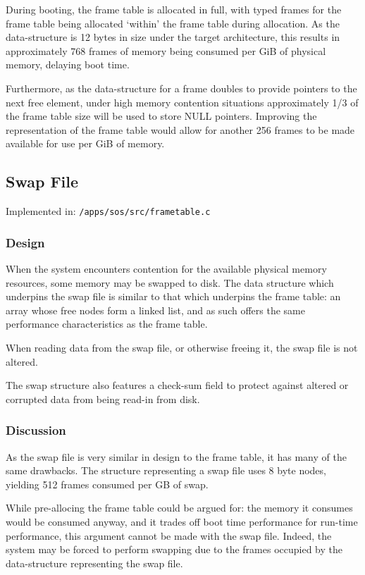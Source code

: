 \documentclass[a4paper,12pt]{article}
\begin{document}
During booting, the frame table is allocated in full, with typed frames for
the frame table being allocated `within' the frame table during allocation.
As the data-structure is 12 bytes in size under the target architecture, this
results in approximately 768 frames of memory being consumed per GiB of
physical memory, delaying boot time.

Furthermore, as the data-structure for a frame doubles to provide pointers to
the next free element, under high memory contention situations approximately
1/3 of the frame table size will be used to store NULL pointers.  Improving
the representation of the frame table would allow for another 256 frames to be
made available for use per GiB of memory.

\subsection{Swap File}
Implemented in: \texttt{/apps/sos/src/frametable.c}

\subsubsection{Design}
When the system encounters contention for the available physical memory
resources, some memory may be swapped to disk.  The data structure which
underpins the swap file is similar to that which underpins the frame table: an
array whose free nodes form a linked list, and as such offers the same
performance characteristics as the frame table.

When reading data from the swap file, or otherwise freeing it, the swap file
is not altered.

The swap structure also features a check-sum field to protect against altered
or corrupted data from being read-in from disk.

\subsubsection{Discussion}
As the swap file is very similar in design to the frame table, it has many of
the same drawbacks.  The structure representing a swap file uses 8 byte nodes,
yielding 512 frames consumed per GB of swap.

While pre-allocing the frame table could be argued for: the memory it consumes
would be consumed anyway, and it trades off boot time performance for run-time
performance, this argument cannot be made with the swap file.  Indeed, the
system may be forced to perform swapping due to the frames occupied by the
data-structure representing the swap file.
\end{document}

